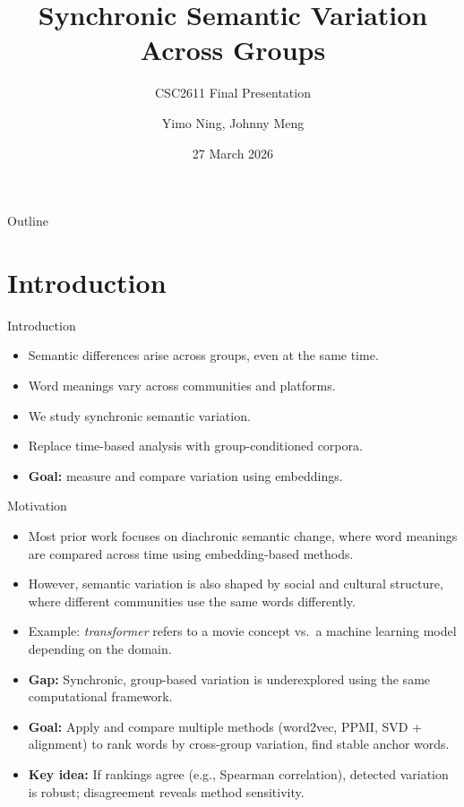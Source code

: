 \documentclass[aspectratio=169]{beamer}
\title{Synchronic Semantic Variation Across Groups}
\subtitle{CSC2611 Final Presentation}
\author{Yimo Ning, Johnny Meng}
\date{27 March 2026}
\begin{document}
\begin{frame}
  \titlepage
\end{frame}

\begin{frame}{Outline}
    \tableofcontents
\end{frame}


\section{Introduction}

\begin{frame}{Introduction}
  \begin{itemize}
    \item Semantic differences arise across groups, even at the same time.
    \item Word meanings vary across communities and platforms.
    \item We study synchronic semantic variation.
    \item Replace time-based analysis with group-conditioned corpora.
    \item \textbf{Goal:} measure and compare variation using embeddings.
  \end{itemize}
\end{frame}

\begin{frame}{Motivation}
  \begin{itemize}
    \item Most prior work focuses on diachronic semantic change, where word meanings are compared across time using embedding-based methods.
    \item However, semantic variation is also shaped by social and cultural structure, where different communities use the same words differently.
    \item Example: \textit{transformer} refers to a movie concept vs.\ a machine learning model depending on the domain.
    \item \textbf{Gap:} Synchronic, group-based variation is underexplored using the same computational framework.
    \item \textbf{Goal:} Apply and compare multiple methods (word2vec, PPMI, SVD + alignment) to rank words by cross-group variation, find stable anchor words. 
    \item \textbf{Key idea:} If rankings agree (e.g., Spearman correlation), detected variation is robust; disagreement reveals method sensitivity.
  \end{itemize}
\end{frame}
\end{document}
